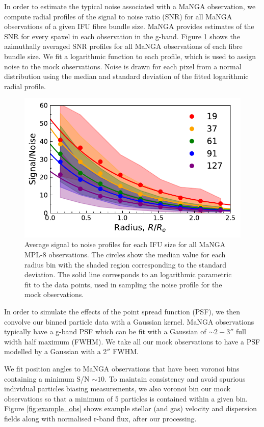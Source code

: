 \documentclass[fleqn,usenatbib]{mnras}
\begin{document}
In order to estimate the typical noise associated with a MaNGA observation, we compute radial profiles of the signal to noise ratio (SNR) for all MaNGA observations of a given IFU fibre bundle size. MaNGA provides estimates of the SNR for every spaxel in each observation in the g-band. Figure \ref{fig:noise_profile} shows the azimuthally averaged SNR profiles for all MaNGA observations of each fibre bundle size. We fit a logarithmic function to each profile, which is used to assign noise to the mock observations. Noise is drawn for each pixel from a normal distribution using the median and standard deviation of the fitted logarithmic radial profile.   

\begin{figure}
	\includegraphics[width=\linewidth]{noise_profiles_ifusize.pdf}
    \caption{Average signal to noise profiles for each IFU size for all MaNGA MPL-8 observations. The circles show the median value for each radius bin with the shaded region corresponding to the standard deviation. The solid line corresponds to an logarithmic parametric fit to the data points, used in sampling the noise profile for the mock observations.}
    \label{fig:noise_profile}
\end{figure}

In order to simulate the effects of the point spread function (PSF), we then convolve our binned particle data with a Gaussian kernel. MaNGA observations typically have a g-band PSF which can be fit with a Gaussian of $\sim 2-3''$ full width half maximum (FWHM). We take all our mock observations to have a PSF modelled by a Gaussian with a 2$''$ FWHM. 

We fit position angles to MaNGA observations that have been voronoi bins containing a minimum S/N $\sim 10$. To maintain consistency and avoid spurious individual particles biasing measurements, we also voronoi bin our mock observations so that a minimum of 5 particles is contained within a given bin. Figure \ref{fig:example_obs} shows example stellar (and gas) velocity and dispersion fields along with normalised r-band flux, after our processing. 
\end{document}
